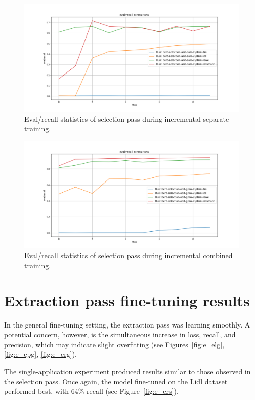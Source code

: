 \documentclass[licencjacka,en]{pracamgr}
\begin{document}
\begin{figure}[htbp]
    \centering
    \includegraphics[width=0.8\linewidth]{bachelor_images/bert_ft/s_eras.png}
    \caption{Eval/recall statistics of selection pass during incremental separate training.}
    \label{fig:s_eras}
\end{figure}

\begin{figure}[htbp]
    \centering
    \includegraphics[width=0.8\linewidth]{bachelor_images/bert_ft/s_erag.png}
    \caption{Eval/recall statistics of selection pass during incremental combined training.}
    \label{fig:s_erag}
\end{figure}

\FloatBarrier

\section{Extraction pass fine-tuning results}
In the general fine-tuning setting, the extraction pass was learning smoothly. A potential concern, however, is the simultaneous increase in loss, recall, and precision, which may indicate slight overfitting (see Figures~\ref{fig:e_elg}, \ref{fig:e_epg}, \ref{fig:e_erg}).

The single-application experiment produced results similar to those observed in the selection pass. Once again, the model fine-tuned on the Lidl dataset performed best, with 64\% recall (see Figure~\ref{fig:e_ers}).
\end{document}
